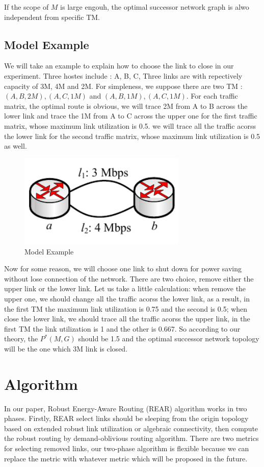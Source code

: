 \documentclass[conference]{IEEEtran}
\begin{document}
If the scope of $M$ is large engouh, the optimal successor network graph is alwo independent from specific TM. 

\subsection{Model Example}
We will take an example to explain how to choose the link to close in our experiment.
Three hostes include : A, B, C, Three links are with repectively capacity of 3M, 4M and 2M. For simpleness, we suppose 
there are two TM : ${(A,B,2M), (A,C,1M)}$ and ${(A,B,1M), (A,C,1M)}$. For each traffic matrix, the optimal route is 
obvious, we will trace 2M from A to B across the lower link and trace the 1M from A to C across the upper one 
for the first traffic matrix, whose maximum link utilization is 0.5. we will trace all the traffic acorss the
lower link for the second traffic matrix, whose maximum link utilization is 0.5 as well.


\begin{figure}[!t]
\centering
\vspace*{0.1in}
\includegraphics[width=8cm]{3-nodes-example}
\caption{Model Example}
\label{label}
\vspace*{0.1in}
\end{figure}


Now for some reason, we will choose one link to shut down for power saving without lose connection of the network. 
There are two choice, remove either the upper link or the lower link. Let us take a little calculation: when 
remove the upper one, we should change all the traffic acorss the lower link, as a result, in the first  
TM the maximum link utilization is 0.75 and the second is 0.5; when close the lower link, we should trace all the 
traffic acorss the upper link, in the first TM the link utilization is 1 and the other is 0.667. 
So according to our theory, the $P^{*}(M, G)$ should be 1.5 and the optimal successor network topology will be
the one which 3M link is closed.

\section{Algorithm}
In our paper, Robust Energy-Aware Routing (REAR) algorithm works in two phases. Firstly, REAR select links 
should be sleeping from the origin topology based on extended robust link utilization or algebraic connectivity, 
then compute the robust routing by demand-oblivious routing algorithm. There are two metrics
for selecting removed links, our two-phase algorithm is flexible because we can replace the metric with whatever
metric which will be proposed in the future.
\end{document}
